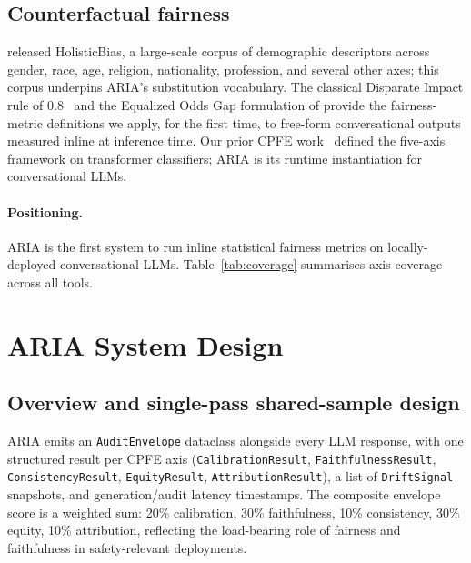 \documentclass{article}
\begin{document}
\subsection{Counterfactual fairness}

\citet{smith2022holisticbias} released HolisticBias, a large-scale corpus
of demographic descriptors across gender, race, age, religion,
nationality, profession, and several other axes; this corpus underpins
ARIA's substitution vocabulary.
The classical Disparate Impact rule of $0.8$~\citep{feldman2015certifying}
and the Equalized Odds Gap formulation of \citet{hardt2016equality}
provide the fairness-metric definitions we apply, for the first time, to
free-form conversational outputs measured inline at inference time.
Our prior CPFE work~\citep{pall2026cpfe} defined the five-axis framework
on transformer classifiers; ARIA is its runtime instantiation for
conversational LLMs.

\paragraph{Positioning.}
ARIA is the first system to run inline statistical fairness metrics on
locally-deployed conversational LLMs.
Table~\ref{tab:coverage} summarises axis coverage across all tools.

\section{ARIA System Design}
\label{sec:design}

\subsection{Overview and single-pass shared-sample design}
\label{sec:overview}

ARIA emits an \texttt{AuditEnvelope} dataclass alongside every LLM
response, with one structured result per CPFE axis
(\texttt{CalibrationResult}, \texttt{FaithfulnessResult},
\texttt{ConsistencyResult}, \texttt{EquityResult},
\texttt{AttributionResult}), a list of \texttt{DriftSignal} snapshots, and
generation/audit latency timestamps.
The composite envelope score is a weighted sum: 20\% calibration,
30\% faithfulness, 10\% consistency, 30\% equity, 10\% attribution,
reflecting the load-bearing role of fairness and faithfulness in
safety-relevant deployments.
\end{document}
